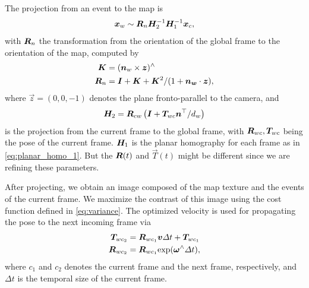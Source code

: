 The projection from an event to the map is
\begin{equation}
  \label{eq:frame2map}
  \vec{x}_w \sim \mat{R}_n\mat{H}_2^{-1}\mat{H}_1^{-1}\vec{x}_c,
\end{equation}
with $\mat{R}_n$ the transformation from the orientation of the global
frame to the orientation of the map, computed by
\begin{align}
  \mat{K}& =(\vec{n}_w\times \vec{z})^\wedge\\
  \mat{R}_n&=\mat{I} +\mat{K} + \mat{K}^2/ (1 +  \vec{n_w}\cdot\vec{z}),  \label{eq:global2map}
\end{align}
where $\vec{z}=(0,0,-1)$ denotes the plane fronto-parallel to the
camera, and
\begin{equation}
  \label{eq:frame2global}
  \mat{H}_2 = \mat{R}_{cw}\left(\mat{I} + \vec{T}_{wc}\vec{n}^\top/d_w\right)
\end{equation}
is the projection from the current frame to the global frame, with
$\mat{R}_{wc}, \mat{T}_{wc}$ being the pose of the current
frame. $\mat{H}_1$ is the planar homography for each frame as in
\cref{eq:planar_homo_1}. But the $\mat{R}(t)$ and $\vec{T}(t)$ might
be different since we are refining these parameters.

After projecting, we obtain an image composed of the map texture and
the events of the current frame. We maximize the contrast of this
image using the cost function defined in \cref{eq:variance}. The
optimized velocity is used for propagating the pose to the next
incoming frame via
\begin{align}
  \label{eq:pose_propagation}
  \vec{T}_{wc_2}&=\mat{R}_{wc_1}\vec{v}\Delta t+ \vec{T}_{wc_1}\\
  \mat{R}_{wc_2}& =\mat{R}_{wc_1}\mathrm{exp}(\bm{\omega}^\wedge \Delta t),
\end{align}
where $c_1$ and $c_2$ denotes the current frame and the next frame,
respectively, and $\Delta t$ is the temporal size of the current
frame.

